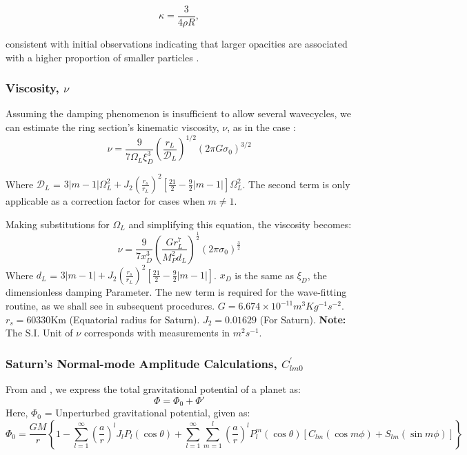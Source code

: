 \documentclass{article}
\begin{document}
\begin{equation}
    \kappa = \frac{3}{4\rho R},
\end{equation}

consistent with initial observations indicating that larger opacities are associated with a higher proportion of smaller particles \cite{SHU1983185}.


\subsubsection{Viscosity, $\nu$}
Assuming the damping phenomenon is insufficient to allow several wavecycles, we can estimate the ring section's kinematic viscosity, $\nu$, as in the case \cite{GOLDREICH1978240,1984prin.conf..513S,Tiscareno_2007}:
\begin{equation}
    \nu = \frac{9}{7\Omega_{L}\xi_{D}^{3}}\left(\frac{r_{L}}{\mathcal{D}_{L}}\right)^{1/2}(2\pi G \sigma_{0})^{3/2}
\end{equation}
 
 Where $\mathcal{D}_{L}$ = $3|m-1|\Omega_{L}^{2} + J_{2}(\frac{r_{s}}{r_{L}})^{2}[\frac{21}{2}-\frac{9}{2}|m-1|]\Omega_{L}^{2}$. The second term is only applicable as a correction factor for cases when $m \neq 1$.

Making substitutions for $\Omega_{L}$ and simplifying this equation, the viscosity becomes: 
\begin{equation}
    \nu = \frac{9}{7 x_{D}^{3}}(\frac{Gr_{L}^{7}}{M_{P}^{2}d_{L}})^{\frac{1}{2}}(2\pi\sigma_{0})^{\frac{3}{2}}
\end{equation}
 Where $d_{L}$ = $3|m-1| + J_{2}(\frac{r_{s}}{r_{L}})^{2}[\frac{21}{2}-\frac{9}{2}|m-1|]$. $x_{D}$ is the same as $\xi_{D}$, the dimensionless damping Parameter. The new term is required for the wave-fitting routine, as we shall see in subsequent procedures. $G = 6.674 \times 10^{-11}m^{3} Kg^{-1} s^{-2}$. $r_{s} = 60330$Km (Equatorial radius for Saturn). $J_{2} = 0.01629$ (For Saturn). \textbf{Note:} The S.I. Unit of $\nu$ corresponds with measurements in $m^{2}s^{-1}$.


\subsubsection{Saturn's Normal-mode Amplitude Calculations, $C_{lm0}^{'}$}
From \cite{Marley1993PlanetaryAM} and \cite{Zharkov1985ThePO}, we express the total gravitational potential of a planet as: \begin{equation}
    \Phi = \Phi_{0} + \Phi{'}
\end{equation}
Here, $\Phi_{0}$ = Unperturbed gravitational potential, given as: 
\begin{equation}
\Phi_{0} = \frac{GM}{r}\left\{1 - \sum_{l=1}^{\infty}\left(\frac{a}{r}\right)^{l}J_{l}P_{l}(\cos \theta) + \sum_{l=1}^{\infty}\sum_{m=1}^{l}\left(\frac{a}{r}\right)^{l}P_{l}^{m}(\cos \theta)[C_{lm}(\cos m\phi) + S_{lm}(\sin m\phi)]\right\}
\end{equation}
\end{document}
